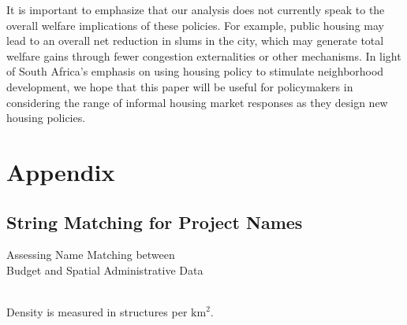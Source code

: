 \documentclass[12pt]{article}
\begin{document}
It is important to emphasize that our analysis does not currently speak to the overall welfare implications of these policies.  For example, public housing may lead to an overall net reduction in slums in the city, which may generate total welfare gains through fewer congestion externalities or other mechanisms.  In light of South Africa's emphasis on using housing policy to stimulate neighborhood development, we hope that this paper will be useful for policymakers in considering the range of informal housing market responses as they design new housing policies.






\pagebreak
\nocite{*}
\singlespacing
\setlength{\bibsep}{7pt}





\pagebreak
\appendix
\doublespacing

\section{Appendix}

\subsection{String Matching for Project Names}

\begin{table}
	\centering
	\caption{Assessing Name Matching between \\Budget and Spatial Administrative Data}\label{table:stringmatch}
 \\
Density is measured in structures per $\text{km}^{2}$.

\end{table}
\end{document}
